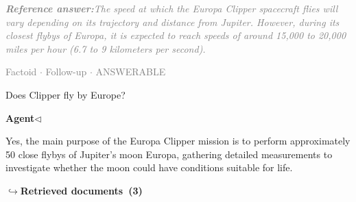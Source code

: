 \documentclass[a4paper,11pt]{article}
\begin{document}
\begin{refanswerenv}
{\footnotesize\textit{\textcolor{gray}{\textbf{Reference answer:}\enspace The speed at which the Europa Clipper spacecraft flies will vary depending on its trajectory and distance from Jupiter. However, during its closest flybys of Europa, it is expected to reach speeds of around 15,000 to 20,000 miles per hour (6.7 to 9 kilometers per second).}}}
\end{refanswerenv}
\vspace{0.5em}
\hfill{\tiny\textcolor{gray}{Factoid $\cdot$ Follow-up $\cdot$ ANSWERABLE}}
\begin{userbubble}
Does Clipper fly by Europe?
\end{userbubble}
\noindent\hfill{\small\textcolor{agentcolor}{\textbf{Agent\enspace$\triangleleft$}}}
\begin{agentbubble}
Yes, the main purpose of the Europa Clipper mission is to perform approximately 50 close flybys of Jupiter's moon Europa, gathering detailed measurements to investigate whether the moon could have conditions suitable for life.
\end{agentbubble}
\noindent\hfill{\footnotesize\textcolor{doccolor}{\textbf{$\hookrightarrow$\enspace Retrieved documents~(3)}}}
\end{document}
